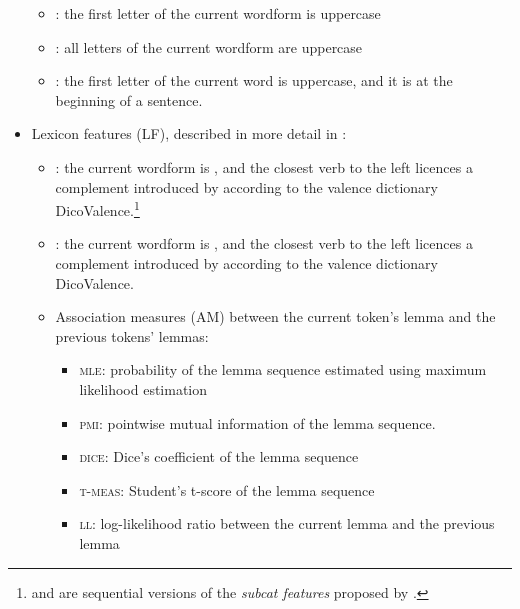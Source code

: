 \documentclass[output=paper,modfonts]{langscibook}
\begin{document}
\begin{itemize}
\begin{itemize}
\item {}: the first letter of the current wordform  is uppercase
\item {}: all letters of the current wordform  are uppercase
\item {}: the first letter of the current word  is uppercase, and it is at the beginning of a sentence.
\end{itemize}
\item Lexicon features %
({\textsc LF}), described in more detail in :
\begin{itemize}
\item {}: the current wordform  is , and the closest verb to the left licences a complement introduced by  according to the valence dictionary DicoValence.\footnote{ and  are sequential versions of the \emph{subcat features} proposed by \citet{nasr:acl:2015}.}
\item {}: the current wordform  is , and the closest verb to the left licences a complement introduced by  according to the valence dictionary DicoValence.
\item Association measures (\textsc{AM}) between the current token's lemma  and the previous tokens' lemmas:
\begin{itemize}
\item \textsc{mle}: probability of the lemma sequence estimated using maximum likelihood estimation
\item \textsc{pmi}: pointwise mutual information of the lemma sequence.
\item \textsc{dice}: Dice's coefficient of the lemma sequence
\item \textsc{t-meas}: Student's t-score of the lemma sequence
\item \textsc{ll}: log-likelihood ratio between the current lemma and the previous lemma
\end{itemize}
\end{itemize}
\end{itemize}
\end{document}
